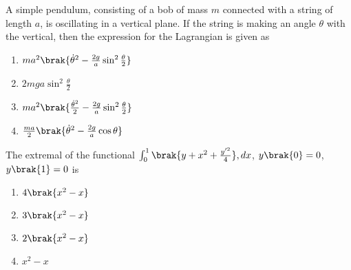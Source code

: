 \iffalse
    \author{EE24BTECH11061}
    \section{ma}
    \chapter{2009}
 \fi
\item A simple pendulum, consisting of a bob of mass $m$ connected with a string of length $a$, is oscillating in a vertical plane. If the string is making an angle $\theta$ with the vertical, then the expression for the Lagrangian is given as
\begin{multicols}{2}
    \begin{enumerate}
        \item $ma^2\brak{\dot{\theta}^2 - \frac{2g}{a} \sin^2{\frac{\theta}{2}}}$
        \item $2mga \sin^2{\frac{\theta}{2}}$
        \item $ma^2\brak{\frac{\dot{\theta}^2}{2} - \frac{2g}{a} \sin^2{\frac{\theta}{2}}}$
        \item $\frac{ma}{2}\brak{\dot{\theta}^2 - \frac{2g}{a} \cos{\theta}}$
    \end{enumerate}
\end{multicols}

\item The extremal of the functional $\int_0^1 \brak{y+x^2 + \frac{y^{\prime 2}}{4}}, dx$, $y\brak{0} = 0$, $y\brak{1} = 0$ is
\begin{multicols}{2}
    \begin{enumerate}
        \item $4\brak{x^2-x}$
        \item $3\brak{x^2-x}$
        \item $2\brak{x^2-x}$
        \item $x^2-x$
    \end{enumerate}
\end{multicols}

